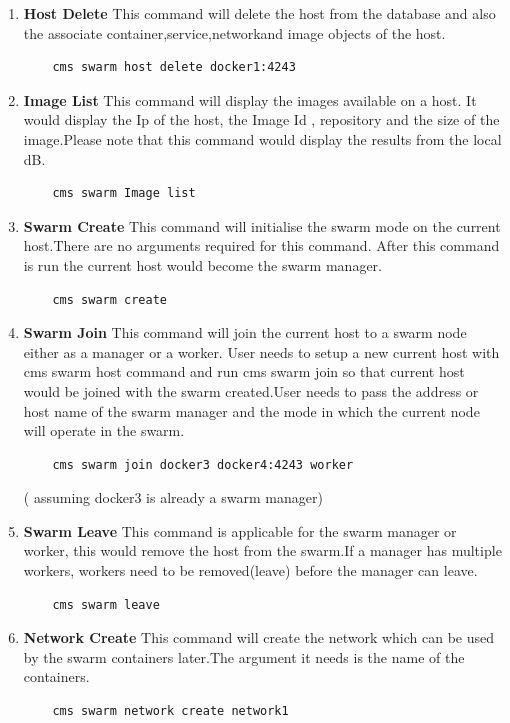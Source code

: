 \documentclass[9pt,twocolumn,twoside]{../../styles/osajnl}
\begin{document}
\begin{enumerate}
    \item \textbf{Host Delete}
    This command will delete the host from the database and also the associate container,service,networkand image objects of the host.
    \begin{verbatim}
    cms swarm host delete docker1:4243
    \end{verbatim} 
    \item \textbf{Image List}
    This command will display the images available on a host.
    It would display the Ip of the host, the Image Id , repository and the size of the image.Please note that this command would display the results from the local dB.
    \begin{verbatim}
    cms swarm Image list
    \end{verbatim}  
    \item \textbf{Swarm Create}
    This command will initialise the  swarm mode on the current host.There are no arguments required for this command. After this command is run the current host would become the swarm manager.
    \begin{verbatim}
    cms swarm create
    \end{verbatim} 
    \item \textbf{Swarm Join}
    This command will join the current host to a swarm node either as a manager or a worker. User needs to setup a new current host with cms swarm host command and run cms swarm join so that current host would be joined with the swarm created.User needs to pass the address or host name of the swarm manager and the mode in which the current node will operate in the swarm.
    \begin{verbatim}
    cms swarm join docker3 docker4:4243 worker
    \end{verbatim} 
    ( assuming docker3 is already a swarm manager)  
    \item \textbf{Swarm Leave}
    This command is applicable for the swarm manager or worker, this would remove the host from the swarm.If a manager has multiple workers, workers need to be removed(leave) before the manager can leave.
    \begin{verbatim}
    cms swarm leave 
    \end{verbatim}  
    \item \textbf{Network Create}
    This command will create the network which can be used by the swarm containers later.The argument it needs is the name of the containers.
    \begin{verbatim}
    cms swarm network create network1 

\end{verbatim}
\end{enumerate}
\end{document}
